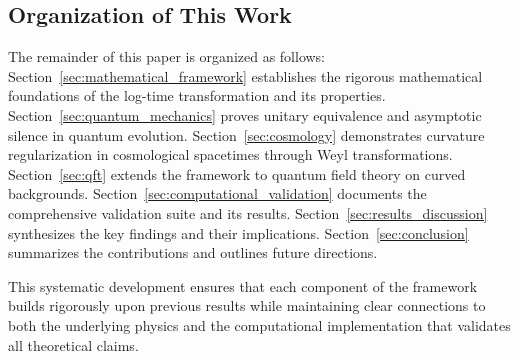 \subsection{Organization of This Work}

The remainder of this paper is organized as follows: Section~\ref{sec:mathematical_framework} establishes the rigorous mathematical foundations of the log-time transformation and its properties. Section~\ref{sec:quantum_mechanics} proves unitary equivalence and asymptotic silence in quantum evolution. Section~\ref{sec:cosmology} demonstrates curvature regularization in cosmological spacetimes through Weyl transformations. Section~\ref{sec:qft} extends the framework to quantum field theory on curved backgrounds. Section~\ref{sec:computational_validation} documents the comprehensive validation suite and its results. Section~\ref{sec:results_discussion} synthesizes the key findings and their implications. Section~\ref{sec:conclusion} summarizes the contributions and outlines future directions.

This systematic development ensures that each component of the framework builds rigorously upon previous results while maintaining clear connections to both the underlying physics and the computational implementation that validates all theoretical claims.